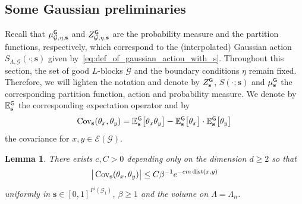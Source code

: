 \documentclass[11pt]{article}
\newtheorem{lemma}[theorem]{Lemma}
\theoremstyle{definition}
\theoremstyle{remark}
\numberwithin{theorem}{section}
\def\La{{\Lambda}}
\newcommand{\bE}{\mathbb E}
\newcommand{\cE}{\mathcal{E}}
\newcommand{\Cov}{\operatorname{Cov}}
\begin{document}
    \subsection{Some Gaussian preliminaries}
    Recall that $\mu_{\mathcal{G}, \eta, \mathbf{s}}^{\sf G}$ and $Z_{\mathcal{G},\eta ,\mathbf{s}}^{\sf G}$ are the probability measure and the partition functions, respectively, which correspond to the (interpolated) Gaussian action $S_{\La,\mathcal{G}}(\cdot ; \mathbf{s})$ given by~\eqref{eq:def_of_gaussian_action_with_s}. Throughout this section, the set of good $L$-blocks $\mathcal{G}$ and the boundary conditions $\eta$ remain fixed. Therefore, we will lighten  the notation and denote by $Z_{\mathbf{s}}^{\sf G}$, $S(\cdot ; \mathbf{s})$ and $\mu_{\mathbf{s}}^{\sf G}$ the corresponding partition function, action and probability measure. We denote by $\bE_{\mathbf{s}}^{\sf G}$ the corresponding expectation operator and by 
    \begin{equation}
        \label{eq:covariance_of_interpolated_gaussian}
        \Cov_{\mathbf{s}}(\theta_x,\theta_y) = \bE_{\mathbf{s}}^{\sf G}\big[\theta_x \theta_y \big] - \bE_{\mathbf{s}}^{\sf G}\big[\theta_x \big]\cdot \bE_{\mathbf{s}}^{\sf G}\big[\theta_y \big] 
    \end{equation}
    the covariance for $x,y\in \cE(\mathcal{G})$. 
    \begin{lemma}
        \label{lemma:proca_field_is_massive}
        There exists $c,C>0$ depending only on the dimension $d\ge 2$ so that
        \[
        \big| \Cov_{\mathbf{s}}(\theta_x,\theta_y) \big| \le C \beta^{-1} e^{-c m \, \text{\normalfont dist}(x,y) }
        \]
        uniformly in $\mathbf{s}\in [0,1]^{P^\prime(\mathcal{G}_1)}$, $\beta\ge 1$ and the volume on $\La= \La_n$. 
    \end{lemma}
\end{document}
